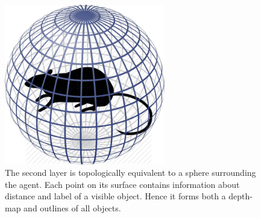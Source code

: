 \documentclass[12pt]{article}
\begin{document}
\begin{figure}[!h]
	\centering
	\includegraphics[width=7cm]{rodent_in_sphere}
	\caption{The second layer is topologically equivalent to a sphere surrounding the agent. Each point on its surface contains information about distance and label of a visible object. Hence it forms both a depth-map and outlines of all objects.}
	\label{fig:rodent_in_sphere}
\end{figure}
\end{document}
